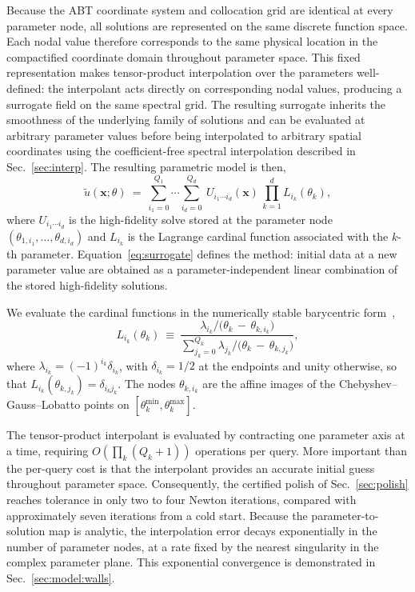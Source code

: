 \documentclass[
  aps,
  prd,
  twocolumn,
  amsmath,
  amssymb,
  nofootinbib,
  superscriptaddress,
  floatfix,
]{revtex4-2}
\begin{document}
Because the ABT coordinate system and collocation grid are identical at every
parameter node, all solutions are represented on the same discrete function
space. Each nodal value therefore corresponds to the same physical location in
the compactified coordinate domain throughout parameter space. This fixed
representation makes tensor-product interpolation over the parameters
well-defined: the interpolant acts directly on corresponding nodal values,
producing a surrogate field on the same spectral grid. The resulting surrogate
inherits the smoothness of the underlying family of solutions and can be
evaluated at arbitrary parameter values before being interpolated to arbitrary
spatial coordinates using the coefficient-free spectral interpolation described
in Sec.~\ref{sec:interp}.
The resulting parametric model is then,
\begin{equation}
  \tilde{u}(\mathbf{x};\theta) \ = \
  \sum_{i_1=0}^{Q_1}\!\cdots\!\sum_{i_d=0}^{Q_d} \
  U_{i_1\cdots i_d}(\mathbf{x}) \,
  \prod_{k=1}^{d}
  L_{i_k}(\theta_k),
  \label{eq:surrogate}
\end{equation}
where $U_{i_1\cdots i_d}$ is the high-fidelity solve stored at the parameter node
$(\theta_{1,i_1},\dots,\theta_{d,i_d})$ and $L_{i_k}$ is the
Lagrange cardinal function associated with the $k$-th parameter.
Equation~\eqref{eq:surrogate} defines the method: initial data at a new
parameter value are obtained as a parameter-independent linear combination of
the stored high-fidelity solutions.


We evaluate the cardinal functions in the numerically stable barycentric
form~\cite{Trefethen2019},
\begin{equation}
  L_{i_k}(\theta_{k})
  \ \equiv \
  \frac{\displaystyle \lambda_{i_{k}}/\big(\theta_k \, - \, \theta_{k,i_{k}}\big)}
       {\displaystyle \sum_{j_{k}=0}^{Q_k}\lambda_{j_{k}}/\big(\theta_k \, - \, \theta_{k,j_{k}}\big)},
  \label{eq:barycentric}
\end{equation}
where $\lambda_{i_k}=(-1)^{i_k}\delta_{i_k}$, with
$\delta_{i_k}=1/2$ at the endpoints and unity otherwise, so that
$L_{i_k}(\theta_{k,j_k})=\delta_{i_kj_k}$.
The nodes $\theta_{k,i_k}$ are the affine images of the
Chebyshev--Gauss--Lobatto points on
$[\theta_k^{\min},\theta_k^{\max}]$.


The tensor-product interpolant is evaluated by contracting one parameter axis at a time, requiring $O(\prod_k(Q_k+1))$ operations per query.
More important than the per-query cost is that the interpolant provides an
accurate initial guess throughout parameter space. Consequently, the certified
polish of Sec.~\ref{sec:polish} reaches tolerance in only two to four Newton
iterations, compared with approximately seven iterations from a cold start.
Because the parameter-to-solution map is analytic, the
interpolation error decays exponentially in the number of parameter nodes, at a
rate fixed by the nearest singularity in the complex parameter plane.
This exponential convergence is demonstrated in
Sec.~\ref{sec:model:walls}.
\end{document}
